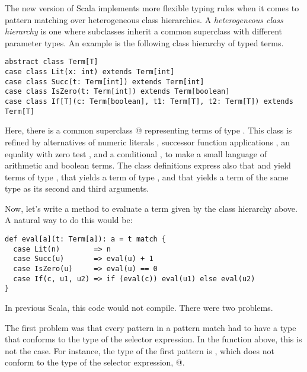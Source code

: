 \documentclass[a4paper,11pt,twoside]{article}
\begin{document}
The new version of Scala implements more flexible typing rules when it
comes to pattern matching over heterogeneous class hierarchies. A {\em
heterogeneous class hierarchy} is one where subclasses inherit a
common superclass with different parameter types. An example is the
following class hierarchy of typed terms. 
\begin{lstlisting}
abstract class Term[T]
case class Lit(x: int) extends Term[int]
case class Succ(t: Term[int]) extends Term[int]
case class IsZero(t: Term[int]) extends Term[boolean]
case class If[T](c: Term[boolean], t1: Term[T], t2: Term[T]) extends Term[T]
\end{lstlisting}
Here, there is a common superclass \lstinline@Term[T]@ representing
terms of type \lstinline@T@. This class is refined by alternatives of
numeric literals \lstinline@Lit@, successor function applications
\lstinline@Succ@, an equality with zero test \lstinline@IsZero@, and a
conditional \lstinline@If@, to make a small language of arithmetic and
boolean terms.
The class definitions express also that \lstinline@Lit@ and
\lstinline@Succ@ yield terms of type \lstinline@int@, that
\lstinline@IsZero@ yields a term of type \lstinline@boolean@, and that
\lstinline@If@ yields a term of the same type as its second and third
arguments.

Now, let's write a method to evaluate a term given by the class hierarchy above.
A natural way to do this would be:
\begin{lstlisting}
def eval[a](t: Term[a]): a = t match {
  case Lit(n)        => n
  case Succ(u)       => eval(u) + 1
  case IsZero(u)     => eval(u) == 0
  case If(c, u1, u2) => if (eval(c)) eval(u1) else eval(u2)
}
\end{lstlisting}
In previous Scala, this code would not compile. There were two problems.

The first problem was that every pattern in a pattern match had to have a
type that conforms to the type of the selector expression. In the
\lstinline@eval@ function above, this is not the case. For instance,
the type of the first pattern is \lstinline@Lit@, which does not
conform to the type of the selector expression, \lstinline@Term[a]@.
\end{document}
